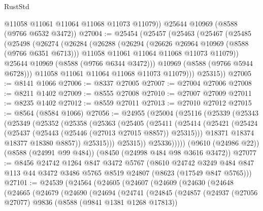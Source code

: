 \begin{lexlean}{RustStd}
\begin{coremodule}
        @11058
        @11061
        @11064
        @11068
        @11073
        @11079))
    @25644
    @10969
    (@8588 (@9766 @6532 @3472))
@27004 := @25454
    (@25457
      (@25463
        (@25467
          (@25485
            (@25498
              (@26274
                (@26284
                  (@26288
                    (@26294
                      (@26626 @26964 @10969 (@8588 (@9766 @6351 @6713)))
                      @11058
                      @11061
                      @11064
                      @11068
                      @11073
                      @11079))
                  @25644
                  @10969
                  (@8588 (@9766 @6344 @3472)))
                @10969
                (@8588 (@9766 @5944 @6728)))
              @11058
              @11061
              @11064
              @11068
              @11073
              @11079)))
        @25315))
@27005 := @8141 @1066
@27006 := @8337 @27005
@27007 := @27004 @27006
@27008 := @8211 @1402
@27009 := @8555 @27008
@27010 := @27007 @27009
@27011 := @8235 @1402
@27012 := @8559 @27011
@27013 := @27010 @27012
@27015 := @8564 (@8584 @1066)
@27056 := @24955
    (@25004
      (@25116
        (@25339
          (@25343
            (@25349
              (@25352
                (@25358
                  (@25363
                    (@25405
                      (@25411
                        (@25414
                          (@25421
                            (@25424 (@25437 (@25443 (@25446 (@27013 @27015 @8857)) @25315)))
                            @18371
                            @18374
                            @18377
                            @18380
                            @8857))
                        @25315)))
                  @25315))
              @25336)))))
    (@9610 (@24986 @22))
    (@8588 (@24991 @99 @484))
    (@8450 (@24998 @484 @98 @3616 @3472))
@27077 := @8456
    @24742
    @1264
    @847
    @3472
    @5767
    (@8610
      @24742
      @3249
      @484
      @847
      @113
      @44
      @3472
      @3486
      @5765
      @8519
      @24807
      (@8623 (@17549 @847 @5765)))
@27101 := @24539
    (@24564
      (@24605
        (@24607
          (@24609
            (@24630
              (@24648
                (@24665
                  (@24679
                    (@24690
                      (@24694
                        (@24741
                          (@24845
                            (@24857
                              (@24937
                                (@27056 @27077)
                                @9836
                                (@8588 (@9841 @1381 @1268 @17813))

\end{coremodule}
\end{lexlean}
